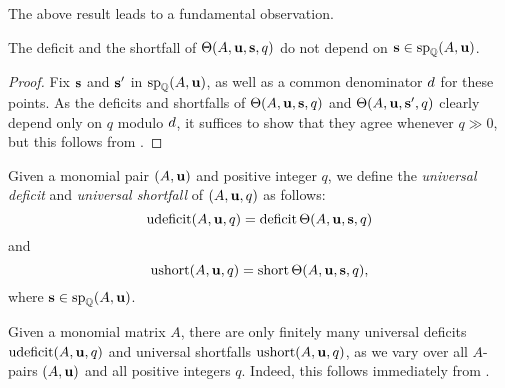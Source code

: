 \documentclass{amsart}
\begin{document}
The above result leads to a fundamental observation.

\begin{corollary}
   \label{independence: C}
The deficit and the shortfall of $\Theta(A, \mathbf{u}, \mathbf{s}, q)$ do not depend on $\mathbf{s} \in \operatorname{sp}_{\mathbb{Q}}(A, \mathbf{u})$.
\end{corollary}

\begin{proof}
   Fix $\mathbf{s}$ and $\mathbf{s}'$ in $\operatorname{sp}_{\mathbb{Q}}(A, \mathbf{u})$, as well as a common denominator $d$ for these points.
   As the deficits and shortfalls of $\Theta(A,\mathbf{u},\mathbf{s},q)$  and $\Theta(A,\mathbf{u},\mathbf{s}',q)$ clearly depend only on $q$ modulo $d$, it suffices to show that they agree whenever $q \gg 0$, but this follows from .
\end{proof}

\begin{definition}
\label{independence: D}
Given a monomial pair $(A, \mathbf{u})$ and positive integer $q$, we define the \emph{universal deficit} and \emph{universal shortfall} of $(A,\mathbf{u},q)$ as follows\textup:
 \[ \operatorname{udeficit}(A, \mathbf{u}, q) = \operatorname{deficit}\Theta( A, \mathbf{u}, \mathbf{s}, q)\] and
\[\operatorname{ushort}(A, \mathbf{u}, q) = \operatorname{short}\Theta( A, \mathbf{u}, \mathbf{s}, q), \]
where  $\mathbf{s} \in \operatorname{sp}_{\mathbb{Q}}(A, \mathbf{u})$.
\end{definition}


%
\begin{remark}
   \label{finitely many deltas for a fixed A: R}
   Given a monomial matrix $A$, there are only finitely many universal deficits $\operatorname{udeficit}(A, \mathbf{u}, q)$ and universal shortfalls $\operatorname{ushort}(A, \mathbf{u}, q)$, as we vary over all $A$-pairs $(A,\mathbf{u})$ and all positive integers $q$.
   Indeed, this follows immediately from .
\end{remark}
\end{document}
